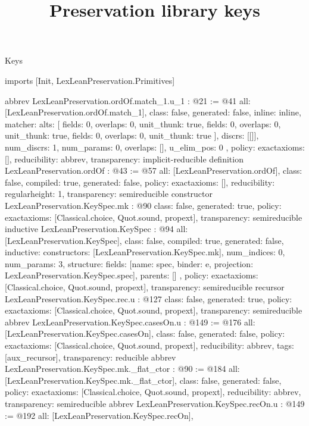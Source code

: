 \begin{lexlean}{Keys}
\title{Preservation library keys}
\begin{coremodule}
imports [Init, LexLeanPreservation.Primitives]

abbrev LexLeanPreservation.ordOf.match_1.{u_1} : @21 := @41 {
  all: [LexLeanPreservation.ordOf.match_1],
  class: false,
  generated: false,
  inline: inline,
  matcher: {
    alts: [
      {fields: 0, overlaps: 0, unit_thunk: true},
      {fields: 0, overlaps: 0, unit_thunk: true},
      {fields: 0, overlaps: 0, unit_thunk: true}
    ],
    discrs: [[]],
    num_discrs: 1,
    num_params: 0,
    overlaps: [],
    u_elim_pos: 0
  },
  policy: exact{axioms: []},
  reducibility: abbrev{},
  transparency: implicit-reducible
}
definition LexLeanPreservation.ordOf : @43 := @57 {
  all: [LexLeanPreservation.ordOf],
  class: false,
  compiled: true,
  generated: false,
  policy: exact{axioms: []},
  reducibility: regular{height: 1},
  transparency: semireducible
}
constructor LexLeanPreservation.KeySpec.mk : @90 {
  class: false,
  generated: true,
  policy: exact{axioms: [Classical.choice, Quot.sound, propext]},
  transparency: semireducible
}
inductive LexLeanPreservation.KeySpec : @94 {
  all: [LexLeanPreservation.KeySpec],
  class: false,
  compiled: true,
  generated: false,
  inductive: {
    constructors: [LexLeanPreservation.KeySpec.mk],
    num_indices: 0,
    num_params: 3,
    structure: {
      fields: [{name: spec, binder: e, projection: LexLeanPreservation.KeySpec.spec}],
      parents: []
    }
  },
  policy: exact{axioms: [Classical.choice, Quot.sound, propext]},
  transparency: semireducible
}
recursor LexLeanPreservation.KeySpec.rec.{u} : @127 {
  class: false,
  generated: true,
  policy: exact{axioms: [Classical.choice, Quot.sound, propext]},
  transparency: semireducible
}
abbrev LexLeanPreservation.KeySpec.casesOn.{u} : @149 := @176 {
  all: [LexLeanPreservation.KeySpec.casesOn],
  class: false,
  generated: false,
  policy: exact{axioms: [Classical.choice, Quot.sound, propext]},
  reducibility: abbrev{},
  tags: [aux_recursor],
  transparency: reducible
}
abbrev LexLeanPreservation.KeySpec.mk._flat_ctor : @90 := @184 {
  all: [LexLeanPreservation.KeySpec.mk._flat_ctor],
  class: false,
  generated: false,
  policy: exact{axioms: [Classical.choice, Quot.sound, propext]},
  reducibility: abbrev{},
  transparency: semireducible
}
abbrev LexLeanPreservation.KeySpec.recOn.{u} : @149 := @192 {
  all: [LexLeanPreservation.KeySpec.recOn],
}
\end{coremodule}
\end{lexlean}
